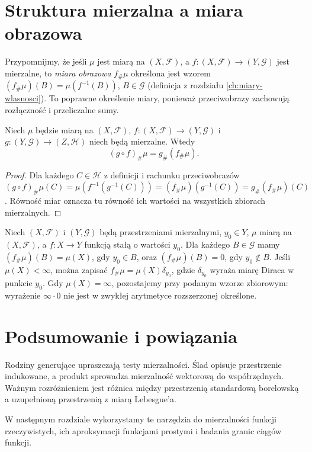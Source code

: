 \section{Struktura mierzalna a miara obrazowa}

Przypomnijmy, że jeśli $\mu$ jest miarą na $(X,\mathcal F)$,
a $f:(X,\mathcal F)\to(Y,\mathcal G)$ jest mierzalne,
to \emph{miara obrazowa} $f_\#\mu$ określona jest wzorem
$(f_\#\mu)(B)=\mu(f^{-1}(B))$, $B\in\mathcal G$
(definicja z rozdziału \ref{ch:miary-wlasnosci}).
To poprawne określenie miary, ponieważ przeciwobrazy
zachowują rozłączność i przeliczalne sumy.

\begin{twierdzenie}
\label{thm:pushforward-composition}
Niech $\mu$ będzie miarą na $(X,\mathcal F)$,
$f:(X,\mathcal F)\to(Y,\mathcal G)$ i
$g:(Y,\mathcal G)\to(Z,\mathcal H)$ niech będą mierzalne.
Wtedy
\[
(g\circ f)_\#\mu=g_\#(f_\#\mu).
\]
\end{twierdzenie}
\begin{proof}
Dla każdego $C\in\mathcal H$ z definicji i
rachunku przeciwobrazów
$(g\circ f)_\#\mu(C)=\mu(f^{-1}(g^{-1}(C)))
=(f_\#\mu)(g^{-1}(C))=g_\#(f_\#\mu)(C)$.
Równość miar oznacza tu równość ich wartości
na wszystkich zbiorach mierzalnych.
\end{proof}

\begin{przyklad}
Niech $(X,\mathcal F)$ i $(Y,\mathcal G)$ będą przestrzeniami
mierzalnymi, $y_0\in Y$, $\mu$ miarą na $(X,\mathcal F)$,
a $f:X\to Y$ funkcją stałą o wartości $y_0$.
Dla każdego $B\in\mathcal G$ mamy $(f_\#\mu)(B)=\mu(X)$,
gdy $y_0\in B$, oraz $(f_\#\mu)(B)=0$, gdy $y_0\notin B$.
Jeśli $\mu(X)<\infty$, można zapisać
$f_\#\mu=\mu(X)\delta_{y_0}$, gdzie $\delta_{y_0}$
wyraża miarę Diraca w punkcie $y_0$.
Gdy $\mu(X)=\infty$, pozostajemy przy podanym wzorze
zbiorowym: wyrażenie $\infty\cdot0$ nie jest w zwykłej
arytmetyce rozszerzonej określone.
\end{przyklad}

\section{Podsumowanie i powiązania}

Rodziny generujące upraszczają testy mierzalności.
Ślad opisuje przestrzenie indukowane, a produkt
sprowadza mierzalność wektorową do współrzędnych.
Ważnym rozróżnieniem jest różnica między przestrzenią
standardową borelowską a uzupełnioną przestrzenią
z miarą Lebesgue'a.

W następnym rozdziale wykorzystamy te narzędzia do
mierzalności funkcji rzeczywistych, ich aproksymacji
funkcjami prostymi i badania granic ciągów funkcji.
